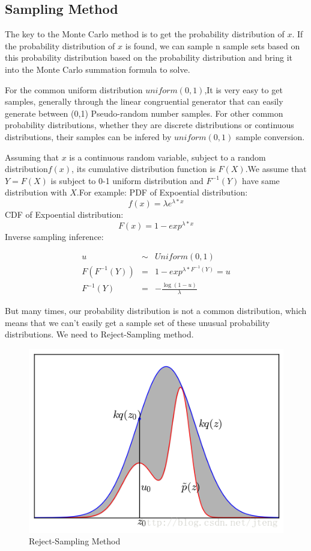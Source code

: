 \subsection{Sampling Method}
The key to the Monte Carlo method is to get the probability distribution of $x$. If the probability distribution of $x$ is found, we can sample n sample sets based on this probability distribution based on the probability distribution and bring it into the Monte Carlo summation formula to solve.

For the common uniform distribution $uniform (0,1)$,It  is very easy to get samples, generally through the linear congruential generator that can easily generate between (0,1) Pseudo-random number samples. For other common probability distributions, whether they are discrete distributions or continuous distributions, their samples can be infered by $uniform (0,1)$ sample conversion.

Assuming that $x$ is a continuous random variable, subject to a random distribution$f(x)$, its cumulative distribution function is $F(X)$.We assume that $Y = F(X)$ is subject to 0-1 uniform distribution and $F^{-1}(Y)$ have same distribution with $X$.For example:
PDF of Expoential distribution:
\[
  f(x) = \lambda e^{\lambda*x}
\]
CDF of Expoential distribution:
\[
  F(x) = 1- exp^{\lambda*x}
\]
Inverse sampling inference:

\begin{eqnarray*}
u & \sim & Uniform(0,1) \\
F(F^{-1}(Y)) &=& 1- exp^{\lambda*F^{-1}(Y)} = u \\
F^{-1}(Y) &=&-\frac{\log(1-u)}{\lambda}
\end{eqnarray*}

But many times, our probability distribution is not a common distribution, which means that we can't easily get a sample set of these unusual probability distributions. We need to Reject-Sampling method.

\begin{figure}
  \includegraphics[width=\linewidth]{reject.png}
  \caption{Reject-Sampling Method}
  \label{fig:boat1}
\end{figure}

